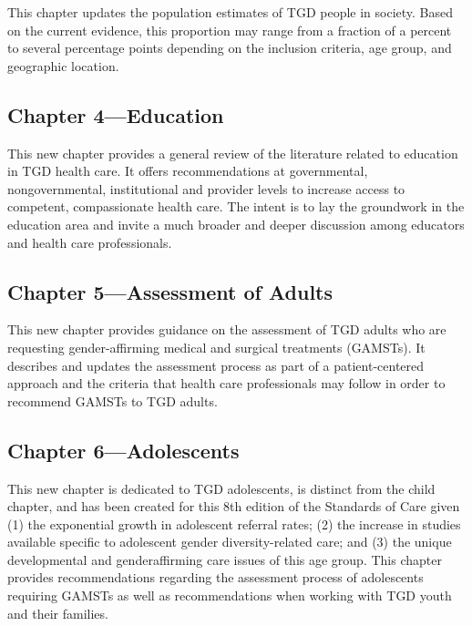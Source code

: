 \documentclass[
]{book}
\begin{document}
This chapter updates the population estimates of
TGD people in society. Based on the current
evidence, this proportion may range from a fraction of a percent to several percentage points
depending on the inclusion criteria, age group,
and geographic location.

\hypertarget{chapter-4education}{%
\subsection*{Chapter 4---Education}\label{chapter-4education}}

This new chapter provides a general review of
the literature related to education in TGD health
care. It offers recommendations at governmental,
nongovernmental, institutional and provider levels
to increase access to competent, compassionate
health care. The intent is to lay the groundwork
in the education area and invite a much broader
and deeper discussion among educators and
health care professionals.

\hypertarget{chapter-5assessment-of-adults}{%
\subsection*{Chapter 5---Assessment of Adults}\label{chapter-5assessment-of-adults}}

This new chapter provides guidance on the
assessment of TGD adults who are requesting
gender-affirming medical and surgical treatments
(GAMSTs). It describes and updates the assessment process as part of a patient-centered
approach and the criteria that health care professionals may follow in order to recommend
GAMSTs to TGD adults.

\hypertarget{chapter-6adolescents}{%
\subsection*{Chapter 6---Adolescents}\label{chapter-6adolescents}}

This new chapter is dedicated to TGD adolescents,
is distinct from the child chapter, and has been
created for this 8th edition of the Standards of
Care given (1) the exponential growth in adolescent referral rates; (2) the increase in studies available specific to adolescent gender diversity-related
care; and (3) the unique developmental and genderaffirming care issues of this age group. This chapter
provides recommendations regarding the assessment process of adolescents requiring GAMSTs as
well as recommendations when working with TGD
youth and their families.
\end{document}
